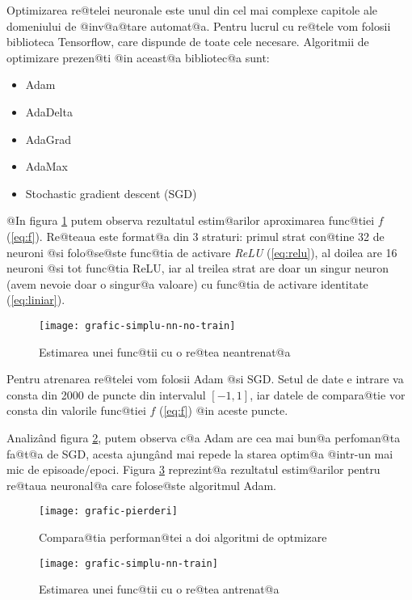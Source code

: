 Optimizarea re@telei neuronale este unul din cel mai complexe capitole ale domeniului de @inv@a@tare automat@a. Pentru lucrul cu re@tele vom folosii biblioteca Tensorflow, care dispunde de toate cele necesare. Algoritmii de optimizare prezen@ti @in aceast@a bibliotec@a sunt:

\begin{itemize}
	\item Adam
	\item AdaDelta
	\item AdaGrad
	\item AdaMax
	\item Stochastic gradient descent (SGD)
\end{itemize} 

@In figura \ref{fig:grafic-simplu-nn-no-train} putem observa rezultatul estim@arilor aproximarea func@tiei $f$ (\ref{eq:f}). Re@teaua este format@a din 3 straturi: primul strat con@tine 32 de neuroni @si folo@se@ste func@tia de activare \textsl{ReLU} (\ref{eq:relu}), al doilea are 16 neuroni @si tot func@tia ReLU, iar al treilea strat are doar un singur neuron (avem nevoie doar o singur@a valoare) cu func@tia de activare identitate (\ref{eq:liniar}).

\begin{figure}[h]
	\centering
	\texttt{[image: grafic-simplu-nn-no-train]}
	\caption{Estimarea unei func@tii cu o re@tea neantrenat@a}
	\label{fig:grafic-simplu-nn-no-train}
\end{figure}

Pentru atrenarea re@telei vom folosii Adam @si SGD. Setul de date e intrare va consta din 2000 de puncte din intervalul $[-1, 1]$, iar datele de compara@tie vor consta din valorile func@tiei $f$ (\ref{eq:f}) @in aceste puncte.

Analiz\^ and figura \ref{fig:grafic-pierderi}, putem observa c@a Adam are cea mai bun@a perfoman@ta fa@t@a de SGD, acesta ajung\^ and mai repede la starea optim@a @intr-un mai mic de episoade/epoci. Figura \ref{fig:grafic-simplu-nn-train} reprezint@a rezultatul estim@arilor pentru re@taua neuronal@a care folose@ste algoritmul Adam.
 
\begin{figure}[H]
	\centering
	\texttt{[image: grafic-pierderi]}
	\caption{Compara@tia performan@tei a doi algoritmi de optmizare}
	\label{fig:grafic-pierderi}
\end{figure}

\begin{figure}[H]
	\centering
	\texttt{[image: grafic-simplu-nn-train]}
	\caption{Estimarea unei func@tii cu o re@tea antrenat@a}
	\label{fig:grafic-simplu-nn-train}
\end{figure}

